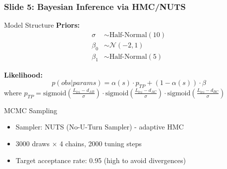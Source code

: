 \documentclass[a4paper,8pt]{beamer}
\begin{document}
\begin{frame}
\frametitle{Slide 5: Bayesian Inference via HMC/NUTS}
\begin{block}{Model Structure}
    \textbf{Priors:}
    \begin{align*}
        \sigma &\sim \text{Half-Normal}(10) \\
        \beta_0 &\sim \mathcal{N}(-2, 1) \\
        \beta_1 &\sim \text{Half-Normal}(5)
    \end{align*}
    
    \textbf{Likelihood:}
    \begin{equation*}
        p(obs|params) = \alpha(s) \cdot p_{TP} + (1-\alpha(s)) \cdot \beta
    \end{equation*}
    where $p_{TP} = \text{sigmoid}\left(\frac{L_{tri} - d_{AB}}{\sigma}\right) \cdot \text{sigmoid}\left(\frac{L_{tri} - d_{AC}}{\sigma}\right) \cdot \text{sigmoid}\left(\frac{L_{tri} - d_{BC}}{\sigma}\right)$
\end{block}

\begin{block}{MCMC Sampling}
    \begin{itemize}
        \item Sampler: NUTS (No-U-Turn Sampler) - adaptive HMC
        \item 3000 draws $\times$ 4 chains, 2000 tuning steps
        \item Target acceptance rate: 0.95 (high to avoid divergences)
    \end{itemize}
\end{block}
\end{frame}
\end{document}
